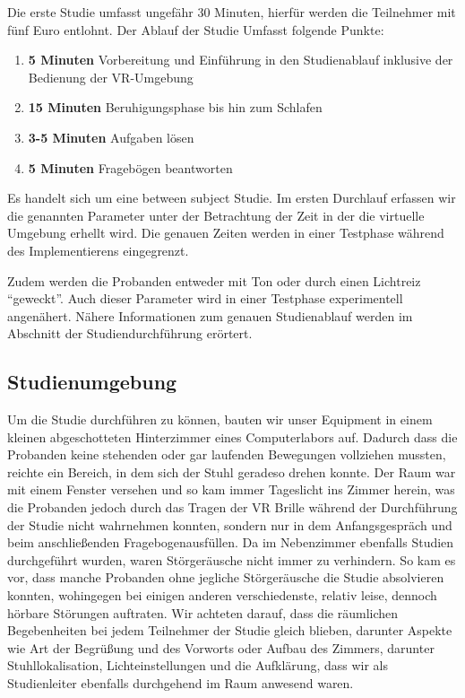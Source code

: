 Die erste Studie umfasst ungefähr 30 Minuten, hierfür werden die Teilnehmer mit fünf Euro entlohnt. Der Ablauf der Studie Umfasst folgende Punkte:

\begin{enumerate}
	\item \textbf{5 Minuten} Vorbereitung und Einführung in den Studienablauf inklusive der Bedienung der VR-Umgebung
	\item \textbf{15 Minuten} Beruhigungsphase bis hin zum Schlafen
	\item \textbf{3-5 Minuten} Aufgaben lösen
	\item \textbf{5 Minuten} Fragebögen beantworten
\end{enumerate}

Es handelt sich um eine between subject Studie. Im ersten Durchlauf erfassen wir die genannten Parameter unter der Betrachtung der Zeit in der die virtuelle Umgebung erhellt wird. Die genauen Zeiten werden in einer Testphase während des Implementierens eingegrenzt.

Zudem werden die Probanden entweder mit Ton oder durch einen Lichtreiz "`geweckt"'. Auch dieser Parameter wird in einer Testphase experimentell angenähert. Nähere Informationen zum genauen Studienablauf werden im Abschnitt der Studiendurchführung erörtert.

\subsection{Studienumgebung}
Um die Studie durchführen zu können, bauten wir unser Equipment in einem kleinen abgeschotteten Hinterzimmer eines Computerlabors auf. Dadurch dass die Probanden keine stehenden oder gar laufenden Bewegungen vollziehen mussten, reichte ein Bereich, in dem sich der Stuhl geradeso drehen konnte. Der Raum war mit einem Fenster versehen und so kam immer Tageslicht ins Zimmer herein, was die Probanden jedoch durch das Tragen der VR Brille während der Durchführung der Studie nicht wahrnehmen konnten, sondern nur in dem Anfangsgespräch und beim anschließenden Fragebogenausfüllen. Da im Nebenzimmer ebenfalls Studien durchgeführt wurden, waren Störgeräusche nicht immer zu verhindern. So kam es vor, dass manche Probanden ohne jegliche Störgeräusche die Studie absolvieren konnten, wohingegen bei einigen anderen verschiedenste, relativ leise, dennoch hörbare Störungen auftraten. Wir achteten darauf, dass die räumlichen Begebenheiten bei jedem Teilnehmer der Studie gleich blieben, darunter Aspekte wie Art der Begrüßung und des Vorworts oder Aufbau des Zimmers, darunter Stuhllokalisation, Lichteinstellungen und die Aufklärung, dass wir als Studienleiter ebenfalls durchgehend im Raum anwesend waren. 
